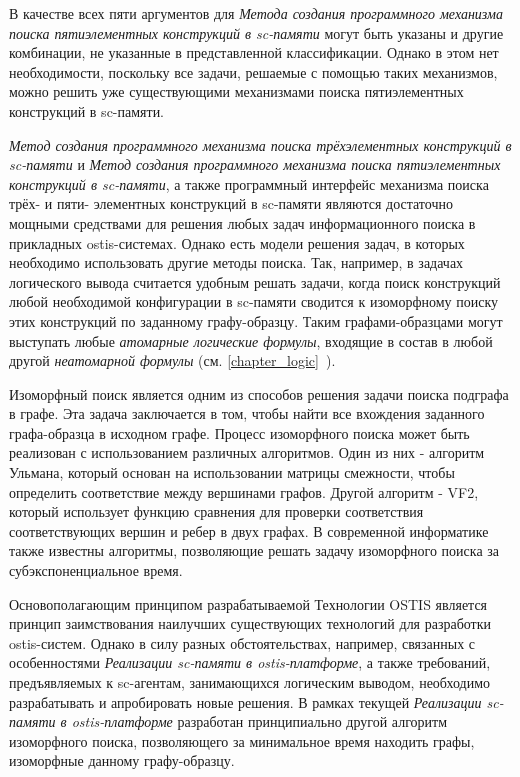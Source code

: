 \begin{SCn}
\begin{scnsubstruct}
\begin{scnsubstruct}
\end{scnsubstruct}

\end{scnsubstruct}
\end{SCn}

В качестве всех пяти аргументов для \textit{Метода создания программного механизма поиска пятиэлементных конструкций в sc-памяти} могут быть указаны и другие комбинации, не указанные в представленной классификации. Однако в этом нет необходимости, поскольку все задачи, решаемые с помощью таких механизмов, можно решить уже существующими механизмами поиска пятиэлементных конструкций в sc-памяти.

\textit{Метод создания программного механизма поиска трёхэлементных конструкций в sc-памяти} и \textit{Метод создания программного механизма поиска пятиэлементных конструкций в sc-памяти}, а также программный интерфейс механизма поиска трёх- и пяти- элементных конструкций в sc-памяти являются достаточно мощными средствами для решения любых задач информационного поиска в прикладных ostis-системах. Однако есть модели решения задач, в которых необходимо использовать другие методы поиска. Так, например, в задачах логического вывода считается удобным решать задачи, когда поиск конструкций любой необходимой конфигурации в sc-памяти сводится к изоморфному поиску этих конструкций по заданному графу-образцу. Таким графами-образцами могут выступать любые \textit{атомарные логические формулы}, входящие в состав в любой другой \textit{неатомарной формулы} (см. \ref{chapter_logic}~).

Изоморфный поиск является одним из способов решения задачи поиска подграфа в графе. Эта задача заключается в том, чтобы найти все вхождения заданного графа-образца в исходном графе. Процесс изоморфного поиска может быть реализован с использованием различных алгоритмов. Один из них - алгоритм Ульмана, который основан на использовании матрицы смежности, чтобы определить соответствие между вершинами графов. Другой алгоритм - VF2, который использует функцию сравнения для проверки соответствия соответствующих вершин и ребер в двух графах. В современной информатике также известны алгоритмы, позволяющие решать задачу изоморфного поиска за субэкспоненциальное время.

Основополагающим принципом разрабатываемой Технологии OSTIS является принцип заимствования наилучших существующих технологий для разработки ostis-систем. Однако в силу разных обстоятельствах, например, связанных с особенностями \textit{Реализации sc-памяти в ostis-платформе}, а также требований, предъявляемых к sc-агентам, занимающихся логическим выводом, необходимо разрабатывать и апробировать новые решения. В рамках текущей \textit{Реализации sc-памяти в ostis-платформе} разработан принципиально другой алгоритм изоморфного поиска, позволяющего за минимальное время находить графы, изоморфные данному графу-образцу.

